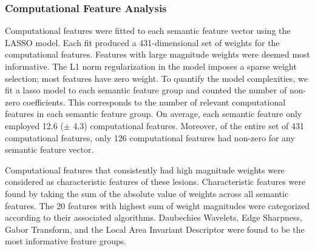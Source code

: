 \subsubsection{Computational Feature Analysis}
Computational features were fitted to each semantic feature vector using the LASSO model. Each fit produced a 431-dimensional set of weights for the computational features. Features with large magnitude weights were deemed most informative.  The L1 norm regularization in the model imposes a sparse weight selection; most features have zero weight. To quantify the model complexities, we fit a lasso model to each semantic feature group and counted the number of non-zero coefficients. This corresponds to the number of relevant computational features in each semantic feature group. On average, each semantic feature only employed 12.6 ($\pm$ 4.3) computational features. Moreover, of the entire set of 431 computational features, only 126 computational features had non-zero for any semantic feature vector.

Computational features that consistently had high magnitude weights were considered as characteristic features of these lesions. Characteristic features were found by taking the sum of the absolute value of weights across all semantic features. The 20 features with highest sum of weight magnitudes were categorized according to their associated algorithms. Daubechies Wavelets, Edge Sharpness, Gabor Transform, and the Local Area Invariant Descriptor were found to be the most informative feature groups.

